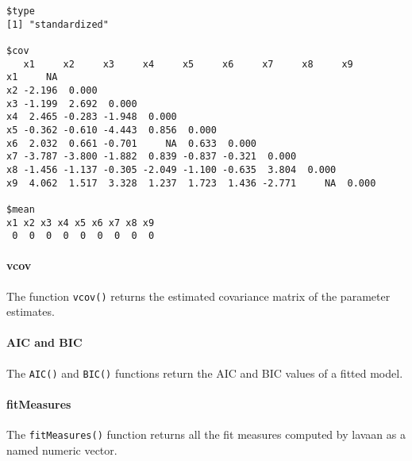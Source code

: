 \begin{Shaded}
\begin{Highlighting}[]
\StringTok{ }
\NormalTok{)}
\end{Highlighting}
\end{Shaded}

\begin{verbatim}
$type
[1] "standardized"

$cov
   x1     x2     x3     x4     x5     x6     x7     x8     x9    
x1     NA                                                        
x2 -2.196  0.000                                                 
x3 -1.199  2.692  0.000                                          
x4  2.465 -0.283 -1.948  0.000                                   
x5 -0.362 -0.610 -4.443  0.856  0.000                            
x6  2.032  0.661 -0.701     NA  0.633  0.000                     
x7 -3.787 -3.800 -1.882  0.839 -0.837 -0.321  0.000              
x8 -1.456 -1.137 -0.305 -2.049 -1.100 -0.635  3.804  0.000       
x9  4.062  1.517  3.328  1.237  1.723  1.436 -2.771     NA  0.000

$mean
x1 x2 x3 x4 x5 x6 x7 x8 x9 
 0  0  0  0  0  0  0  0  0 
\end{verbatim}

\hypertarget{vcov}{%
\paragraph{vcov}\label{vcov}}

The function \texttt{vcov()} returns the estimated covariance matrix of
the parameter estimates.

\hypertarget{aic-and-bic}{%
\paragraph{AIC and BIC}\label{aic-and-bic}}

The \texttt{AIC()} and \texttt{BIC()} functions return the AIC and BIC
values of a fitted model.

\hypertarget{fitmeasures}{%
\paragraph{fitMeasures}\label{fitmeasures}}

The \texttt{fitMeasures()} function returns all the fit measures
computed by lavaan as a named numeric vector.

